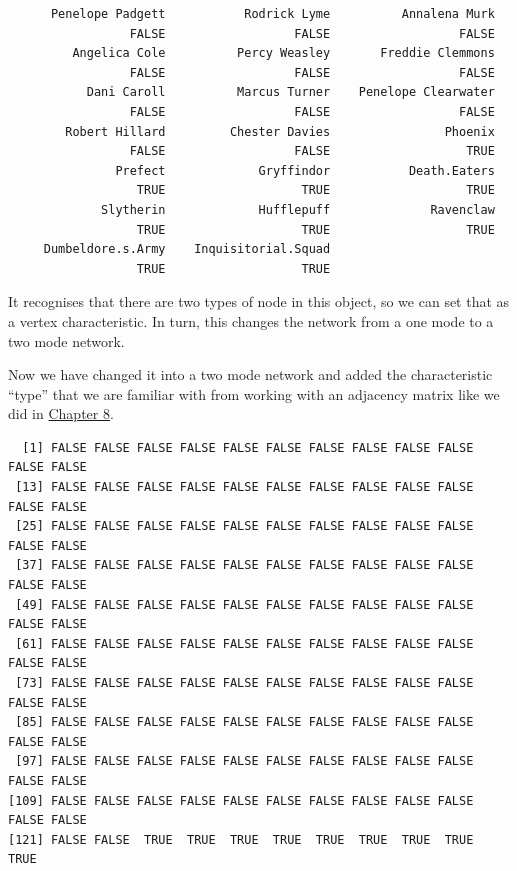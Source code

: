 \documentclass[
  letterpaper,
  DIV=11,
  numbers=noendperiod]{scrreprt}
\newenvironment{Shaded}{\begin{snugshade}}{\end{snugshade}}
\newcommand{\FunctionTok}[1]{\textcolor[rgb]{0.28,0.35,0.67}{#1}}
\newcommand{\NormalTok}[1]{\textcolor[rgb]{0.00,0.23,0.31}{#1}}
\newcommand{\OtherTok}[1]{\textcolor[rgb]{0.00,0.23,0.31}{#1}}
\newcommand{\SpecialCharTok}[1]{\textcolor[rgb]{0.37,0.37,0.37}{#1}}
\begin{document}
\begin{verbatim}
      Penelope Padgett           Rodrick Lyme          Annalena Murk 
                 FALSE                  FALSE                  FALSE 
         Angelica Cole          Percy Weasley       Freddie Clemmons 
                 FALSE                  FALSE                  FALSE 
           Dani Caroll          Marcus Turner    Penelope Clearwater 
                 FALSE                  FALSE                  FALSE 
        Robert Hillard         Chester Davies                Phoenix 
                 FALSE                  FALSE                   TRUE 
               Prefect             Gryffindor           Death.Eaters 
                  TRUE                   TRUE                   TRUE 
             Slytherin             Hufflepuff              Ravenclaw 
                  TRUE                   TRUE                   TRUE 
     Dumbeldore.s.Army    Inquisitorial.Squad 
                  TRUE                   TRUE 
\end{verbatim}

It recognises that there are two types of node in this object, so we can
set that as a vertex characteristic. In turn, this changes the network
from a one mode to a two mode network.

\begin{Shaded}
\end{Shaded}

Now we have changed it into a two mode network and added the
characteristic ``type'' that we are familiar with from working with an
adjacency matrix like we did in
\href{Two\%20Mode\%20Networks\%20-\%20AM.qmd}{Chapter 8}.

\begin{Shaded}
\end{Shaded}

\begin{verbatim}
  [1] FALSE FALSE FALSE FALSE FALSE FALSE FALSE FALSE FALSE FALSE FALSE FALSE
 [13] FALSE FALSE FALSE FALSE FALSE FALSE FALSE FALSE FALSE FALSE FALSE FALSE
 [25] FALSE FALSE FALSE FALSE FALSE FALSE FALSE FALSE FALSE FALSE FALSE FALSE
 [37] FALSE FALSE FALSE FALSE FALSE FALSE FALSE FALSE FALSE FALSE FALSE FALSE
 [49] FALSE FALSE FALSE FALSE FALSE FALSE FALSE FALSE FALSE FALSE FALSE FALSE
 [61] FALSE FALSE FALSE FALSE FALSE FALSE FALSE FALSE FALSE FALSE FALSE FALSE
 [73] FALSE FALSE FALSE FALSE FALSE FALSE FALSE FALSE FALSE FALSE FALSE FALSE
 [85] FALSE FALSE FALSE FALSE FALSE FALSE FALSE FALSE FALSE FALSE FALSE FALSE
 [97] FALSE FALSE FALSE FALSE FALSE FALSE FALSE FALSE FALSE FALSE FALSE FALSE
[109] FALSE FALSE FALSE FALSE FALSE FALSE FALSE FALSE FALSE FALSE FALSE FALSE
[121] FALSE FALSE  TRUE  TRUE  TRUE  TRUE  TRUE  TRUE  TRUE  TRUE  TRUE
\end{verbatim}
\end{document}
